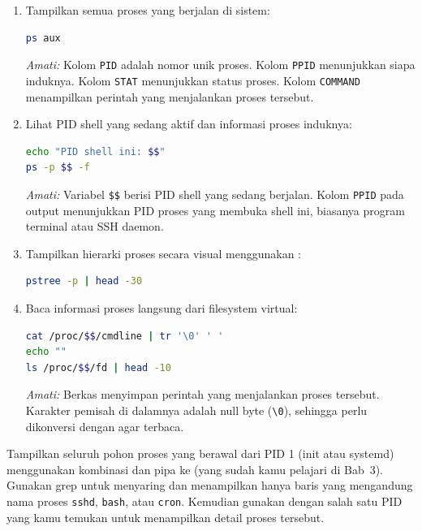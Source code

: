 \begin{enumerate}
    \item Tampilkan semua proses yang berjalan di sistem:
\begin{lstlisting}[language=bash, caption={Menampilkan semua proses dengan ps aux}]
ps aux
\end{lstlisting}
    \textit{Amati:} Kolom \texttt{PID} adalah nomor unik proses. Kolom \texttt{PPID} menunjukkan siapa induknya. Kolom \texttt{STAT} menunjukkan status proses. Kolom \texttt{COMMAND} menampilkan perintah yang menjalankan proses tersebut.

    \item Lihat PID shell yang sedang aktif dan informasi proses induknya:
\begin{lstlisting}[language=bash, caption={Melihat PID shell dan hierarki induknya}]
echo "PID shell ini: $$"
ps -p $$ -f
\end{lstlisting}
    \textit{Amati:} Variabel \texttt{\$\$} berisi PID shell yang sedang berjalan. Kolom \texttt{PPID} pada output menunjukkan PID proses yang membuka shell ini, biasanya program terminal atau SSH daemon.

    \item Tampilkan hierarki proses secara visual menggunakan :
\begin{lstlisting}[language=bash, caption={Melihat pohon proses dengan pstree}]
pstree -p | head -30
\end{lstlisting}

    \item Baca informasi proses langsung dari filesystem virtual:
\begin{lstlisting}[language=bash, caption={Membaca informasi proses dari /proc}]
cat /proc/$$/cmdline | tr '\0' ' '
echo ""
ls /proc/$$/fd | head -10
\end{lstlisting}
    \textit{Amati:} Berkas  menyimpan perintah yang menjalankan proses tersebut. Karakter pemisah di dalamnya adalah null byte (\texttt{\textbackslash0}), sehingga perlu dikonversi dengan  agar terbaca.
\end{enumerate}

\begin{challengebox}
Tampilkan seluruh pohon proses yang berawal dari PID 1 (init atau systemd) menggunakan
kombinasi  dan pipa ke  (yang sudah kamu pelajari di Bab~3).
Gunakan grep untuk menyaring dan menampilkan hanya baris yang mengandung nama proses
\texttt{sshd}, \texttt{bash}, atau \texttt{cron}. Kemudian gunakan  dengan
salah satu PID yang kamu temukan untuk menampilkan detail proses tersebut.
\end{challengebox}

